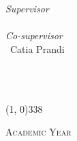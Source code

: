 \begin{titlepage}
\begin{center}
        \vspace{50pt}
        
        \begin{normalsize}
            \begin{flushleft}
                \textit{Supervisor}\\
                \profTitle\ \myProf \\
                \textit{Co-supervisor}\\
                \profTitle\ {Catia Prandi}
            \end{flushleft}

            \vspace{-48pt}
            
            \begin{flushright}
                \textit{\graduateTitle}\\
                \myName\\
                \myStudentID
            \end{flushright}
        \end{normalsize}

        \vspace*{\fill}
        
        \line(1, 0){338} \\
        \begin{normalsize}
            \textsc{Academic Year \myAA}
        \end{normalsize}
    \end{center}
\end{titlepage}
